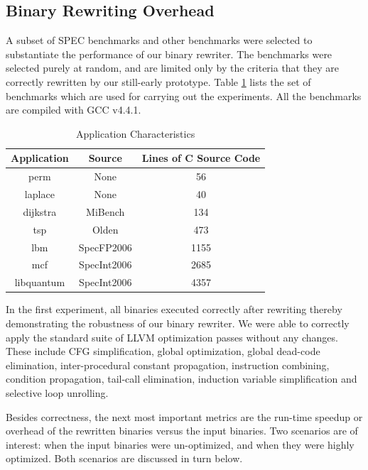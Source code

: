 \subsection{Binary Rewriting Overhead}

A subset of SPEC benchmarks and other benchmarks were selected to substantiate the performance of
our binary rewriter. The benchmarks were selected purely at random, and are limited only by the
criteria that they are correctly rewritten by our still-early prototype. Table \ref{benchlist} lists
the set of benchmarks which are used for carrying out the experiments. All the benchmarks are
compiled with GCC v4.4.1.

\begin{table}
\begin{center}
\begin{tabular}{ | c | c | c | }
\hline
\textbf{Application} & \textbf{Source} & \textbf{Lines of C Source Code} \\
\hline
\hline
perm & None & 56 \\
\hline
laplace & None & 40 \\
\hline
dijkstra & MiBench & 134 \\
\hline
tsp & Olden & 473 \\
\hline
lbm & SpecFP2006 & 1155 \\
\hline
mcf & SpecInt2006 & 2685 \\
\hline
libquantum & SpecInt2006 & 4357 \\
\hline
\end{tabular}
\end{center}

\caption{Application Characteristics}
\label{benchlist}
\end{table}

In the first experiment, all binaries executed correctly after rewriting thereby demonstrating the
robustness of our binary rewriter. We were able to correctly apply the standard suite of LLVM
optimization passes without any changes. These include CFG simplification, global optimization,
global dead-code elimination, inter-procedural constant propagation, instruction combining,
condition propagation, tail-call elimination, induction variable simplification and selective loop
unrolling.

Besides correctness, the next most important metrics are the run-time speedup or overhead of the
rewritten binaries versus the input binaries. Two scenarios are of interest: when the input binaries
were un-optimized, and when they were highly optimized. Both scenarios are discussed in turn below.

